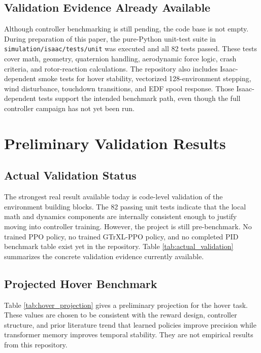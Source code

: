 \documentclass[10pt,twocolumn]{article}
\begin{document}
\subsection{Validation Evidence Already Available}

Although controller benchmarking is still pending, the code base is not empty. During preparation of this paper, the pure-Python unit-test suite in \texttt{simulation/isaac/tests/unit} was executed and all 82 tests passed. These tests cover math, geometry, quaternion handling, aerodynamic force logic, crash criteria, and rotor-reaction calculations. The repository also includes Isaac-dependent smoke tests for hover stability, vectorized 128-environment stepping, wind disturbance, touchdown transitions, and EDF spool response. Those Isaac-dependent tests support the intended benchmark path, even though the full controller campaign has not yet been run.

\section{Preliminary Validation Results}

\subsection{Actual Validation Status}

The strongest real result available today is code-level validation of the environment building blocks. The 82 passing unit tests indicate that the local math and dynamics components are internally consistent enough to justify moving into controller training. However, the project is still pre-benchmark. No trained PPO policy, no trained GTrXL-PPO policy, and no completed PID benchmark table exist yet in the repository. Table \ref{tab:actual_validation} summarizes the concrete validation evidence currently available.

\subsection{Projected Hover Benchmark}

Table \ref{tab:hover_projection} gives a preliminary projection for the hover task. These values are chosen to be consistent with the reward design, controller structure, and prior literature trend that learned policies improve precision while transformer memory improves temporal stability. They are not empirical results from this repository.
\end{document}
